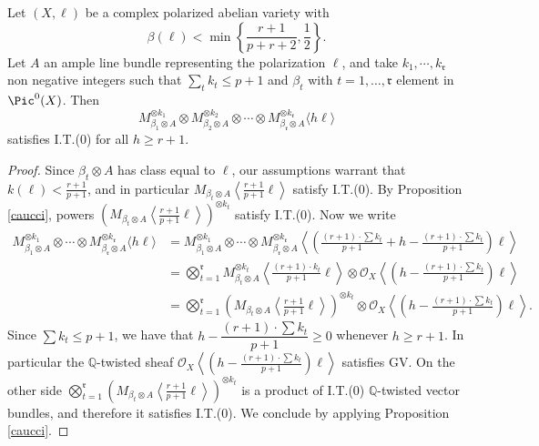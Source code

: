 \documentclass[11pt,letter]{amsart}
\numberwithin{equation}{section}
\begin{document}
\begin{lemma}\label{IT0Q}
    Let $(X,\ell)$ be a complex polarized abelian variety with 
    \[
    \beta(\ell)<\min\left\{\frac{r+1}{p+r+2},\frac{1}{2}\right\}.
    \]
    Let $A$ an ample line bundle representing the polarization $\ell$, and take $k_1,\cdots, k_\mathfrak{r}$  non negative integers such that  $\sum_tk_t\leq p+1$ and $\beta_t$ with $t=1,\ldots, \mathfrak{r}$ element in $\Pic^0(X)$. Then 
    \[M_{\beta_1\otimes A}^{\otimes k_1}\otimes M_{\beta_2\otimes A}^{\otimes k_2}\otimes\cdots\otimes M_{\beta_{\mathfrak{r}}\otimes A}^{\otimes k_\mathfrak{r}}\langle h\ell\rangle \]
    satisfies I.T.(0) for all $h\geq r+1$.
\end{lemma}
\begin{proof}
   Since $\beta_t\otimes A$ has class equal to $\ell$, our assumptions warrant that $k(\ell)<\frac{r+1}{p+1}$, and in particular $M_{\beta_t\otimes A}\left\langle\frac{r+1}{p+1}\ell\right\rangle$ satisfy I.T.(0). By Proposition \ref{caucci}, powers $\left(M_{\beta_t\otimes A}\left\langle\frac{r+1}{p+1}\ell\right\rangle\right)^{\otimes k_t}$ satisfy I.T.(0). Now we write
   \begin{align*}
       M_{\beta_1\otimes A}^{\otimes k_1}\otimes \cdots\otimes M_{\beta_{\mathfrak{r}}\otimes A}^{\otimes k_\mathfrak{r}}\langle h\ell\rangle
       &= M_{\beta_1\otimes A}^{\otimes k_1}\otimes \cdots\otimes M_{\beta_{\mathfrak{r}}\otimes A}^{\otimes k_\mathfrak{r}}\left\langle \left(\frac{(r+1)\cdot\sum k_t}{p+1}+h-\frac{(r+1)\cdot\sum k_t}{p+1}\right)\ell\right\rangle\\
       &= \bigotimes_{t=1}^\mathfrak{r}M_{\beta_t\otimes A}^{\otimes k_t}\left\langle\frac{(r+1)\cdot k_t}{p+1}\ell\right\rangle\otimes \mathcal{O}_X\left\langle \left(h-\frac{(r+1)\cdot\sum k_t}{p+1}\right)\ell\right\rangle\\
       &=\bigotimes_{t=1}^\mathfrak{r} \left(M_{\beta_t\otimes A}\left\langle\frac{r+1}{p+1}\ell\right\rangle\right)^{\otimes k_t}\otimes \mathcal{O}_X\left\langle \left(h-\frac{(r+1)\cdot\sum k_t}{p+1}\right)\ell\right\rangle.
   \end{align*}
   Since $\sum k_t\leq p+1$, we have that $h-\dfrac{(r+1)\cdot\sum k_t}{p+1}\geq 0$ whenever $h\geq r+1$. In particular the $\mathbb{Q}$-twisted sheaf $\mathcal{O}_X\left\langle \left(h-\frac{(r+1)\cdot\sum k_t}{p+1}\right)\ell\right\rangle$ satisfies GV. On the other side $\bigotimes_{t=1}^{\mathfrak{r}} \left(M_{\beta_t\otimes A}\left\langle\frac{r+1}{p+1}\ell\right\rangle\right)^{\otimes k_t}$ is a product of I.T.(0) $\mathbb{Q}$-twisted vector bundles, and therefore it satisfies I.T.(0). We conclude by applying Proposition \ref{caucci}.\end{proof}
   
\end{document}
